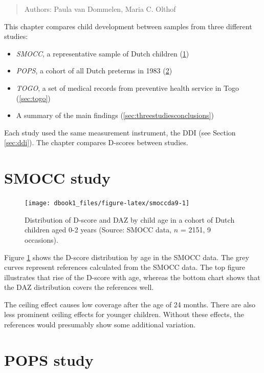\documentclass[
]{book}
\providecommand{\tightlist}{%
  \setlength{\itemsep}{0pt}\setlength{\parskip}{0pt}}
\begin{document}
\begin{quote}
Authors: Paula van Dommelen, Maria C. Olthof
\end{quote}

This chapter compares child development between samples from three different studies:

\begin{itemize}
\tightlist
\item
  \emph{SMOCC}, a representative sample of Dutch children (\ref{sec:smoccstudy})
\item
  \emph{POPS}, a cohort of all Dutch preterms in 1983 (\ref{sec:pops})
\item
  \emph{TOGO}, a set of medical records from preventive health service in Togo (\ref{sec:togo})
\item
  A summary of the main findings (\ref{sec:threestudiesconclusions})
\end{itemize}

Each study used the same measurement instrument, the DDI (see Section \ref{sec:ddi}). The chapter compares D-scores between studies.

\hypertarget{sec:smoccstudy}{%
\section{SMOCC study}\label{sec:smoccstudy}}

\begin{figure}

{\centering \texttt{[image: dbook1\_files/figure-latex/smoccda9-1]} 

}

\caption{Distribution of D-score and DAZ by child age in a cohort of Dutch children aged 0-2 years (Source: SMOCC data, \(n\) = 2151, 9 occasions).}\label{fig:smoccda9}
\end{figure}



Figure \ref{fig:smoccda9} shows the D-score distribution by age in the SMOCC data. The grey curves represent references calculated from the SMOCC data. The top figure illustrates that rise of the D-score with age, whereas the bottom chart shows that the DAZ distribution covers the references well.

The ceiling effect causes low coverage after the age of 24 months. There are also less prominent ceiling effects for younger children. Without these effects, the references would presumably show some additional variation.

\hypertarget{sec:pops}{%
\section{POPS study}\label{sec:pops}}
\end{document}
